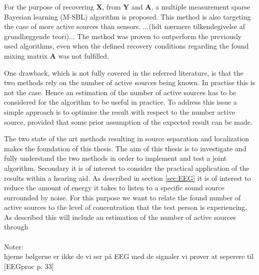 For the purpose of recovering $\textbf{X}$, from $\textbf{Y}$ and $\textbf{A}$, a multiple measurement sparse Bayesian learning (M-SBL) algorithm is proposed. This method is also targeting the case of more active sources than sensors. ...(lidt nærmere tilkendegivelse af grundlæggende teori)...
The method was proven to outperform the previously used algorithms, even when the defined recovery conditions regarding the found mixing matrix $\textbf{A}$ was not fulfilled\cite{Balkan2014}.

One drawback, which is not fully covered in the referred literature, is that the two methods rely on the number of active sources being known. 
In practise this is not the case. 
Hence an estimation of the number of active sources has to be considered for the algorithm to be useful in practice. To address this issue a simple approach is to optimise the result with respect to the number active source, provided that some prior assumption of the expected result can be made.      

The two state of the art methods resulting in source separation and localization makes the foundation of this thesis. 
The aim of this thesis is to investigate and fully understand the two methods in order to implement and test a joint algorithm. 
Secondary it is of interest to consider the practical application of the results within a hearing aid.  
As described in section \ref{sec:EEG} it is of interest to reduce the amount of energy it takes to listen to a specific sound source surrounded by noise.
For this purpose we want to relate the found number of active sources to the level of concentration that the test person is experiencing. 
As described this will include an estimation of the number of active sources through
\\ \\
Noter: \\
hjerne bølgerne er ikke de vi ser på EEG med de signaler vi prøver at seperere til [EEGproc p. 33] 
 
